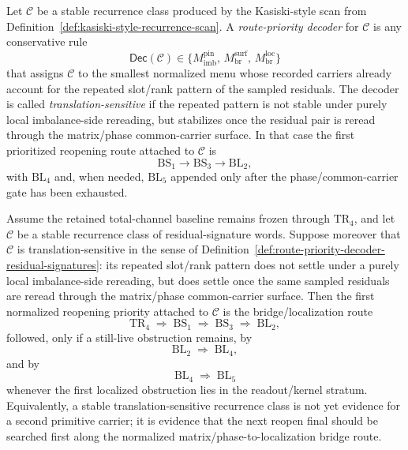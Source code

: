 \begin{definition}
\label{def:route-priority-decoder-residual-signatures}
Let \(\mathcal C\) be a stable recurrence class produced by the Kasiski-style scan from Definition~\ref{def:kasiski-style-recurrence-scan}. A \emph{route-priority decoder} for \(\mathcal C\) is any conservative rule
\[
\mathsf{Dec}(\mathcal C)\in \bigl\{M^{\mathrm{pin}}_{\mathrm{imb}},\,M^{\mathrm{surf}}_{\mathrm{br}},\,M^{\mathrm{loc}}_{\mathrm{br}}\bigr\}
\]
that assigns \(\mathcal C\) to the smallest normalized menu whose recorded carriers already account for the repeated slot/rank pattern of the sampled residuals.
The decoder is called \emph{translation-sensitive} if the repeated pattern is not stable under purely local imbalance-side rereading, but stabilizes once the residual pair is reread through the matrix/phase common-carrier surface. In that case the first prioritized reopening route attached to \(\mathcal C\) is
\[
\mathrm{BS}_1 \to \mathrm{BS}_3 \to \mathrm{BL}_2,
\]
with \(\mathrm{BL}_4\) and, when needed, \(\mathrm{BL}_5\) appended only after the phase/common-carrier gate has been exhausted.
\end{definition}

\begin{proposition}
\label{prop:translation-sensitive-signature-classes-prioritize-bs-bl-route}
Assume the retained total-channel baseline remains frozen through \(\mathrm{TR}_4\), and let \(\mathcal C\) be a stable recurrence class of residual-signature words. Suppose moreover that \(\mathcal C\) is translation-sensitive in the sense of Definition~\ref{def:route-priority-decoder-residual-signatures}: its repeated slot/rank pattern does not settle under a purely local imbalance-side rereading, but does settle once the same sampled residuals are reread through the matrix/phase common-carrier surface. Then the first normalized reopening priority attached to \(\mathcal C\) is the bridge/localization route
\[
\mathrm{TR}_4 \;\Longrightarrow\; \mathrm{BS}_1 \;\Longrightarrow\; \mathrm{BS}_3 \;\Longrightarrow\; \mathrm{BL}_2,
\]
followed, only if a still-live obstruction remains, by
\[
\mathrm{BL}_2 \;\Longrightarrow\; \mathrm{BL}_4,
\]
and by
\[
\mathrm{BL}_4 \;\Longrightarrow\; \mathrm{BL}_5
\]
whenever the first localized obstruction lies in the readout/kernel stratum.
Equivalently, a stable translation-sensitive recurrence class is not yet evidence for a second primitive carrier; it is evidence that the next reopen final should be searched first along the normalized matrix/phase-to-localization bridge route.
\end{proposition}


